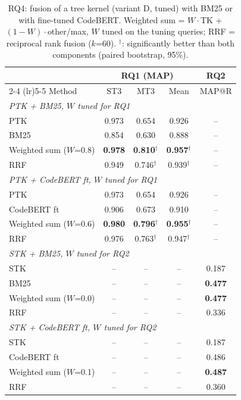 \begin{table}[t]
\centering
\caption{RQ4: fusion of a tree kernel (variant D, tuned) with BM25 or with fine-tuned CodeBERT. Weighted sum = $W\cdot$TK + $(1-W)\cdot$other/max, $W$ tuned on the tuning queries; RRF = reciprocal rank fusion ($k$=60). $^{\dagger}$: significantly better than both components (paired bootstrap, 95\%).}
\label{tab:rq4}
\footnotesize
\setlength{\tabcolsep}{4pt}
\begin{tabular}{lcccc}
\toprule
 & \multicolumn{3}{c}{RQ1 (MAP)} & RQ2 \\ \cmidrule(lr){2-4} \cmidrule(lr){5-5}
Method & ST3 & MT3 & Mean & MAP@R \\
\midrule
\multicolumn{5}{l}{\emph{PTK + BM25, $W$ tuned for RQ1}} \\
\quad PTK & 0.973 & 0.654 & 0.926 & -- \\
\quad BM25 & 0.854 & 0.630 & 0.888 & -- \\
\quad Weighted sum ($W$=0.8) & \textbf{0.978} & \textbf{0.810}$^{\dagger}$ & \textbf{0.957}$^{\dagger}$ & -- \\
\quad RRF & 0.949 & 0.746$^{\dagger}$ & 0.939$^{\dagger}$ & -- \\
\midrule
\multicolumn{5}{l}{\emph{PTK + CodeBERT ft, $W$ tuned for RQ1}} \\
\quad PTK & 0.973 & 0.654 & 0.926 & -- \\
\quad CodeBERT ft & 0.906 & 0.673 & 0.910 & -- \\
\quad Weighted sum ($W$=0.6) & \textbf{0.980} & \textbf{0.796}$^{\dagger}$ & \textbf{0.955}$^{\dagger}$ & -- \\
\quad RRF & 0.976 & 0.763$^{\dagger}$ & 0.947$^{\dagger}$ & -- \\
\midrule
\multicolumn{5}{l}{\emph{STK + BM25, $W$ tuned for RQ2}} \\
\quad STK & -- & -- & -- & 0.187 \\
\quad BM25 & -- & -- & -- & \textbf{0.477} \\
\quad Weighted sum ($W$=0.0) & -- & -- & -- & \textbf{0.477} \\
\quad RRF & -- & -- & -- & 0.336 \\
\midrule
\multicolumn{5}{l}{\emph{STK + CodeBERT ft, $W$ tuned for RQ2}} \\
\quad STK & -- & -- & -- & 0.187 \\
\quad CodeBERT ft & -- & -- & -- & 0.486 \\
\quad Weighted sum ($W$=0.1) & -- & -- & -- & \textbf{0.487} \\
\quad RRF & -- & -- & -- & 0.360 \\
\bottomrule
\end{tabular}
\end{table}
